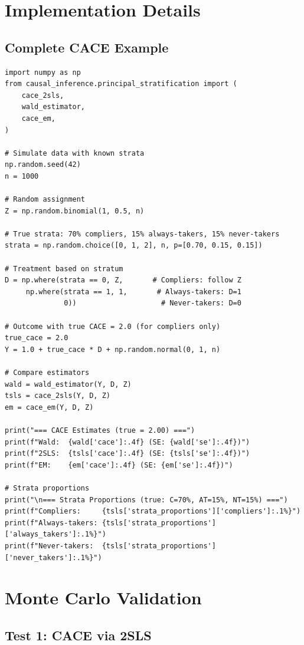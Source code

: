 \section{Implementation Details}

\subsection{Complete CACE Example}

\begin{verbatim}
import numpy as np
from causal_inference.principal_stratification import (
    cace_2sls,
    wald_estimator,
    cace_em,
)

# Simulate data with known strata
np.random.seed(42)
n = 1000

# Random assignment
Z = np.random.binomial(1, 0.5, n)

# True strata: 70% compliers, 15% always-takers, 15% never-takers
strata = np.random.choice([0, 1, 2], n, p=[0.70, 0.15, 0.15])

# Treatment based on stratum
D = np.where(strata == 0, Z,       # Compliers: follow Z
     np.where(strata == 1, 1,       # Always-takers: D=1
              0))                    # Never-takers: D=0

# Outcome with true CACE = 2.0 (for compliers only)
true_cace = 2.0
Y = 1.0 + true_cace * D + np.random.normal(0, 1, n)

# Compare estimators
wald = wald_estimator(Y, D, Z)
tsls = cace_2sls(Y, D, Z)
em = cace_em(Y, D, Z)

print("=== CACE Estimates (true = 2.00) ===")
print(f"Wald:  {wald['cace']:.4f} (SE: {wald['se']:.4f})")
print(f"2SLS:  {tsls['cace']:.4f} (SE: {tsls['se']:.4f})")
print(f"EM:    {em['cace']:.4f} (SE: {em['se']:.4f})")

# Strata proportions
print("\n=== Strata Proportions (true: C=70%, AT=15%, NT=15%) ===")
print(f"Compliers:     {tsls['strata_proportions']['compliers']:.1%}")
print(f"Always-takers: {tsls['strata_proportions']['always_takers']:.1%}")
print(f"Never-takers:  {tsls['strata_proportions']['never_takers']:.1%}")
\end{verbatim}


\section{Monte Carlo Validation}

\subsection{Test 1: CACE via 2SLS}

